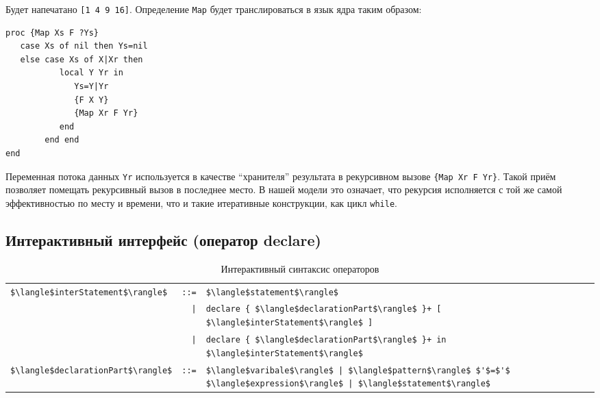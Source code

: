 Будет напечатано \lstinline|[1 4 9 16]|. Определение \lstinline|Map| будет транслироваться в язык ядра таким образом:

\begin{lstlisting}[mathescape=false]
proc {Map Xs F ?Ys}
   case Xs of nil then Ys=nil
   else case Xs of X|Xr then
           local Y Yr in
              Ys=Y|Yr
              {F X Y}
              {Map Xr F Yr}
           end
        end end
end
\end{lstlisting}

Переменная потока данных \lstinline|Yr| используется в качестве ``хранителя'' результата в рекурсивном вызове \lstinline|{Map Xr F Yr}|. Такой приём позволяет помещать рекурсивный вызов в последнее место. В нашей модели это означает, что рекурсия исполняется с той же самой эффективностью по месту и времени, что и такие итеративные конструкции, как цикл \lstinline|while|.

\subsection{Интерактивный интерфейс (оператор declare)}

\begin{table}
  \begin{tabular}{|lrl|}
    \hline
    \lstinline|$\langle$interStatement$\rangle$| & \lstinline|::=| & \lstinline|$\langle$statement$\rangle$|\\
    & \lstinline!|!& \lstinline|declare { $\langle$declarationPart$\rangle$ }+ [ $\langle$interStatement$\rangle$ ]|\\
    & \lstinline!|!& \lstinline|declare { $\langle$declarationPart$\rangle$ }+ in $\langle$interStatement$\rangle$|\\
    \lstinline|$\langle$declarationPart$\rangle$| & \lstinline|::=| & \lstinline!$\langle$varibale$\rangle$ | $\langle$pattern$\rangle$ $'$=$'$ $\langle$expression$\rangle$ | $\langle$statement$\rangle$!\\
    \hline
  \end{tabular}
\caption{Интерактивный синтаксис операторов}
\label{table:interactive_statement_syntax}
\end{table}

